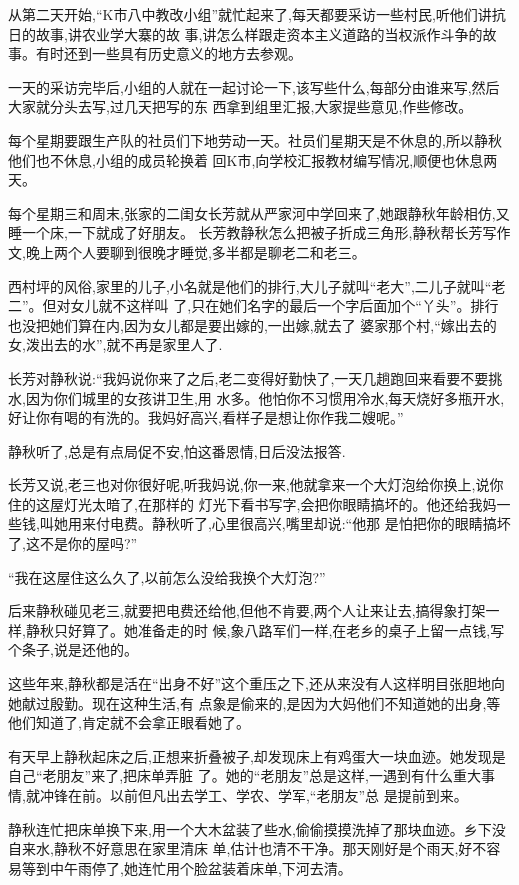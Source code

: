 ﻿\documentclass[12pt]{article}
\begin{document}
从第二天开始,``K市八中教改小组''就忙起来了,每天都要采访一些村民,听他们讲抗日的故事,讲农业学大寨的故
事,讲怎么样跟走资本主义道路的当权派作斗争的故事。有时还到一些具有历史意义的地方去参观。

一天的采访完毕后,小组的人就在一起讨论一下,该写些什么,每部分由谁来写,然后大家就分头去写,过几天把写的东
西拿到组里汇报,大家提些意见,作些修改。

每个星期要跟生产队的社员们下地劳动一天。社员们星期天是不休息的,所以静秋他们也不休息,小组的成员轮换着
回K市,向学校汇报教材编写情况,顺便也休息两天。

每个星期三和周末,张家的二闺女长芳就从严家河中学回来了,她跟静秋年龄相仿,又睡一个床,一下就成了好朋友。
长芳教静秋怎么把被子折成三角形,静秋帮长芳写作文,晚上两个人要聊到很晚才睡觉,多半都是聊老二和老三。

西村坪的风俗,家里的儿子,小名就是他们的排行,大儿子就叫``老大'',二儿子就叫``老二''。但对女儿就不这样叫
了,只在她们名字的最后一个字后面加个``丫头''。排行也没把她们算在内,因为女儿都是要出嫁的,一出嫁,就去了
婆家那个村,``嫁出去的女,泼出去的水'',就不再是家里人了.

长芳对静秋说:``我妈说你来了之后,老二变得好勤快了,一天几趟跑回来看要不要挑水,因为你们城里的女孩讲卫生,用
水多。他怕你不习惯用冷水,每天烧好多瓶开水,好让你有喝的有洗的。我妈好高兴,看样子是想让你作我二嫂呢。''

静秋听了,总是有点局促不安,怕这番恩情,日后没法报答.

长芳又说,老三也对你很好呢,听我妈说,你一来,他就拿来一个大灯泡给你换上,说你住的这屋灯光太暗了,在那样的
灯光下看书写字,会把你眼睛搞坏的。他还给我妈一些钱,叫她用来付电费。静秋听了,心里很高兴,嘴里却说:``他那
是怕把你的眼睛搞坏了,这不是你的屋吗?''

``我在这屋住这么久了,以前怎么没给我换个大灯泡?''
 
后来静秋碰见老三,就要把电费还给他,但他不肯要,两个人让来让去,搞得象打架一样,静秋只好算了。她准备走的时
候,象八路军们一样,在老乡的桌子上留一点钱,写个条子,说是还他的。

这些年来,静秋都是活在``出身不好''这个重压之下,还从来没有人这样明目张胆地向她献过殷勤。现在这种生活,有
点象是偷来的,是因为大妈他们不知道她的出身,等他们知道了,肯定就不会拿正眼看她了。

有天早上静秋起床之后,正想来折叠被子,却发现床上有鸡蛋大一块血迹。她发现是自己``老朋友''来了,把床单弄脏
了。她的``老朋友''总是这样,一遇到有什么重大事情,就冲锋在前。以前但凡出去学工、学农、学军,``老朋友''总
是提前到来。

静秋连忙把床单换下来,用一个大木盆装了些水,偷偷摸摸洗掉了那块血迹。乡下没自来水,静秋不好意思在家里清床
单,估计也清不干净。那天刚好是个雨天,好不容易等到中午雨停了,她连忙用个脸盆装着床单,下河去清。
\end{document}
